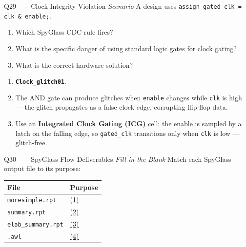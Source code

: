 \documentclass[12pt,a4paper]{article}
\newcommand{\advanced}{%
  \fbox{\textcolor{advred}{\bfseries\sffamily\small ADVANCED}}}
\newcommand{\moderate}{%
  \fbox{\textcolor{modoran}{\bfseries\sffamily\small MODERATE}}}
\begin{document}
\begin{questionbox}{Q29 \advanced\ --- Clock Integrity Violation \hfill\textit{Scenario}}
A design uses \texttt{assign gated\_clk = clk \& enable;}.
\begin{enumerate}[label=\textbf{\alph*)}]
  \item Which SpyGlass CDC rule fires?
  \item What is the specific danger of using standard logic gates for clock gating?
  \item What is the correct hardware solution?
\end{enumerate}
\end{questionbox}

\begin{answerbox}
\begin{enumerate}[label=\textbf{\alph*)}]
  \item \textbf{\texttt{Clock\_glitch01}}.
  \item The AND gate can produce glitches when \texttt{enable} changes while \texttt{clk} is high --- the glitch propagates as a false clock edge, corrupting flip-flop data.
  \item Use an \textbf{Integrated Clock Gating (ICG)} cell: the enable is sampled by a latch on the falling edge, so \texttt{gated\_clk} transitions only when \texttt{clk} is low --- glitch-free.
\end{enumerate}
\end{answerbox}

\begin{questionbox}{Q30 \moderate\ --- SpyGlass Flow Deliverables \hfill\textit{Fill-in-the-Blank}}
Match each SpyGlass output file to its purpose:

\begin{center}
\begin{tabular}{|l|l|}
\hline
\rowcolor{dkblue!15}
\textbf{File} & \textbf{Purpose}\\
\hline
\texttt{moresimple.rpt} & \underline{(1)}\\
\hline
\texttt{summary.rpt} & \underline{(2)}\\
\hline
\texttt{elab\_summary.rpt} & \underline{(3)}\\
\hline
\texttt{.awl} & \underline{(4)}\\
\hline
\end{tabular}
\end{center}
\end{questionbox}
\end{document}
